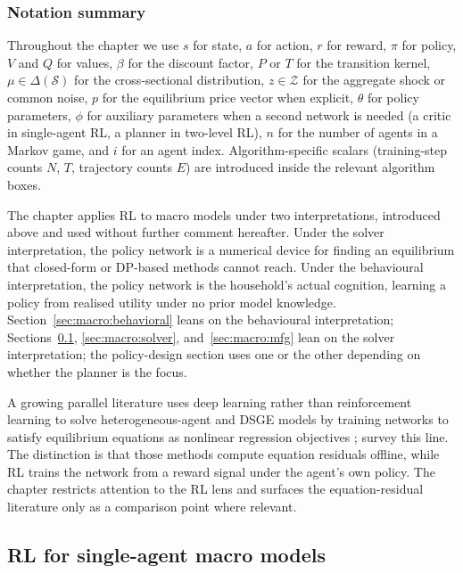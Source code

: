 \subsubsection{Notation summary}

Throughout the chapter we use $s$ for state, $a$ for action, $r$ for
reward, $\pi$ for policy, $V$ and $Q$ for values, $\beta$ for the
discount factor, $P$ or $T$ for the transition kernel,
$\mu \in \Delta(\mathcal S)$ for the cross-sectional distribution,
$z \in \mathcal Z$ for the aggregate shock or common noise, $p$ for
the equilibrium price vector when explicit, $\theta$ for policy
parameters, $\phi$ for auxiliary parameters when a second network is
needed (a critic in single-agent RL, a planner in two-level RL), $n$
for the number of agents in a Markov game, and $i$ for an agent
index. Algorithm-specific scalars (training-step counts $N$, $T$,
trajectory counts $E$) are introduced inside the relevant algorithm
boxes.

The chapter applies RL to macro models under two interpretations,
introduced above and used without further comment hereafter. Under
the solver interpretation, the policy network is a numerical device
for finding an equilibrium that closed-form or DP-based methods
cannot reach. Under the behavioural interpretation, the policy
network is the household's actual cognition, learning a policy from
realised utility under no prior model knowledge.
Section~\ref{sec:macro:behavioral} leans on the behavioural
interpretation; Sections~\ref{sec:macro:solver_single_agent},
\ref{sec:macro:solver}, and~\ref{sec:macro:mfg} lean on the solver
interpretation; the policy-design section uses one or the other
depending on whether the planner is the focus.

A growing parallel literature uses deep learning rather than
reinforcement learning to solve heterogeneous-agent and DSGE models
by training networks to satisfy equilibrium equations as nonlinear
regression objectives \citep{Maliar2021dl, Azinovic2022den,
Azinovic2026sequence, Kase2025hank, Kase2025gem,
HallHoffarth2023constraints, Carmona2021mfg, Fang2026dpi,
Thoeni2025nmfg}; \citet{Fernandez2024dl} survey this line. The
distinction is that those methods compute equation residuals offline,
while RL trains the network from a reward signal under the agent's
own policy. The chapter restricts attention to the RL lens and
surfaces the equation-residual literature only as a comparison point
where relevant.

\subsection{RL for single-agent macro models}
\label{sec:macro:solver_single_agent}

